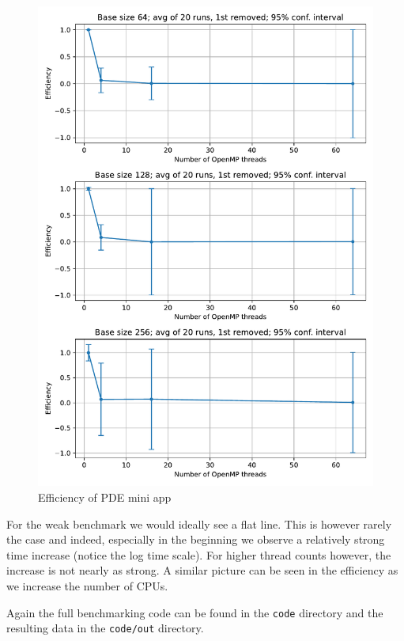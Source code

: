 \documentclass[unicode,11pt,a4paper,oneside,numbers=endperiod,openany]{scrartcl}
\begin{document}
\begin{figure}[h!t]
    \includegraphics[width=\textwidth]{plots/weak_efficiency.pdf}
    \caption{Efficiency of PDE mini app}
    \label{fig:weak_efficiency}
\end{figure}

For the weak benchmark we would ideally see a flat line. This is however rarely the case and indeed, especially in the beginning we observe a relatively strong time increase (notice the log time scale). For higher thread counts however, the increase is not nearly as strong. A similar picture can be seen in the efficiency as we increase the number of CPUs.

Again the full benchmarking code can be found in the \texttt{code} directory and the resulting data in the \texttt{code/out} directory.
\end{document}
